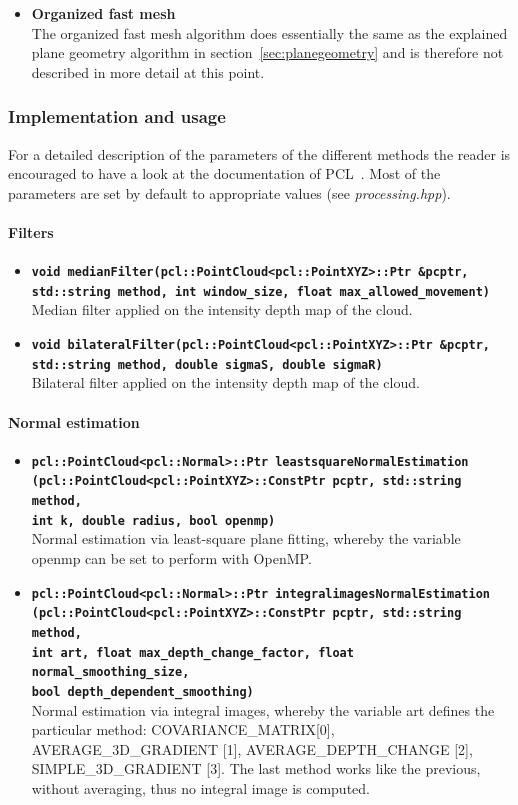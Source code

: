\documentclass[paper=a4,11pt,bibliography=totoc]{scrartcl}
\begin{document}
\begin{itemize}
\item \textbf{Organized fast mesh}\\
The organized fast mesh algorithm does essentially the same as the explained plane geometry algorithm in section~\ref{sec:planegeometry} and is therefore not described in more detail at this point.
%
\end{itemize}
%
\subsubsection*{\color{darkred}Implementation and usage}
%
For a detailed description of the parameters of the different methods the reader is encouraged to have a look at the documentation of PCL~\cite{pcldoc}. Most of the parameters are set by default to appropriate values (see \textit{processing.hpp}).
%
\paragraph*{Filters}
%
\begin{itemize}
\item \textbf{\texttt{void medianFilter(pcl::PointCloud<pcl::PointXYZ>::Ptr \&pcptr,\\std::string method, int window\_size, float max\_allowed\_movement)}}\\
\textsf{Median filter applied on the intensity depth map of the cloud.}
\item \textbf{\texttt{void bilateralFilter(pcl::PointCloud<pcl::PointXYZ>::Ptr \&pcptr,\\std::string method, double sigmaS, double sigmaR)}}\\
\textsf{Bilateral filter applied on the intensity depth map of the cloud.}
\end{itemize}
%
\paragraph*{Normal estimation}
%
\begin{itemize}
\item \textbf{\texttt{pcl::PointCloud<pcl::Normal>::Ptr leastsquareNormalEstimation\\(pcl::PointCloud<pcl::PointXYZ>::ConstPtr pcptr, std::string method,\\int k, double radius, bool openmp)}}\\
\textsf{Normal estimation via least-square plane fitting, whereby the variable openmp can be set to perform with OpenMP.}
\item \textbf{\texttt{pcl::PointCloud<pcl::Normal>::Ptr integralimagesNormalEstimation\\(pcl::PointCloud<pcl::PointXYZ>::ConstPtr pcptr, std::string method,\\int art, float max\_depth\_change\_factor, float normal\_smoothing\_size,\\bool depth\_dependent\_smoothing)}}\\
\textsf{Normal estimation via integral images, whereby the variable art defines the particular method: COVARIANCE\_MATRIX[0], AVERAGE\_3D\_GRADIENT [1], AVERAGE\_DEPTH\_CHANGE [2], SIMPLE\_3D\_GRADIENT [3]. The last method works like the previous, without averaging, thus no integral image is computed.}
\end{itemize}
%
\end{document}
